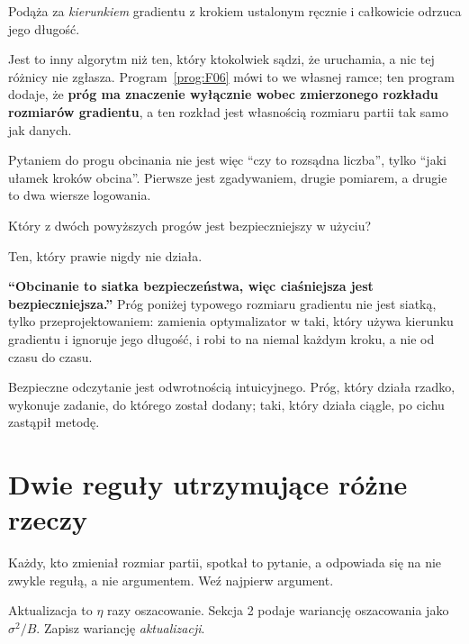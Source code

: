 \begin{fr}
\begin{ansblock}
Podąża za \emph{kierunkiem} gradientu z krokiem ustalonym ręcznie i całkowicie
odrzuca jego długość.
\end{ansblock}

Jest to inny algorytm niż ten, który ktokolwiek sądzi, że uruchamia, a nic tej
różnicy nie zgłasza. Program~\ref{prog:F06} mówi to we własnej ramce; ten
program dodaje, że \textbf{próg ma znaczenie wyłącznie wobec zmierzonego
rozkładu rozmiarów gradientu}, a ten rozkład jest własnością rozmiaru partii
tak samo jak danych.

Pytaniem do progu obcinania nie jest więc \enquote{czy to rozsądna liczba},
tylko \enquote{jaki ułamek kroków obcina}. Pierwsze jest zgadywaniem, drugie
pomiarem, a drugie to dwa wiersze logowania.

Który z dwóch powyższych progów jest bezpieczniejszy w użyciu?
\nextframe
\end{fr}

\begin{fr}
\begin{ansblock}
Ten, który prawie nigdy nie działa.
\end{ansblock}

\begin{trapbox}
\textbf{\enquote{Obcinanie to siatka bezpieczeństwa, więc ciaśniejsza jest
bezpieczniejsza.}} Próg poniżej typowego rozmiaru gradientu nie jest siatką,
tylko przeprojektowaniem: zamienia optymalizator w taki, który używa kierunku
gradientu i ignoruje jego długość, i robi to na niemal każdym kroku, a nie od
czasu do czasu.

Bezpieczne odczytanie jest odwrotnością intuicyjnego. Próg, który działa
rzadko, wykonuje zadanie, do którego został dodany; taki, który działa ciągle,
po cichu zastąpił metodę.
\end{trapbox}
\end{fr}

\section{Dwie reguły utrzymujące różne rzeczy}
\label{sec:P21-scaling}

\begin{fr}
Każdy, kto zmieniał rozmiar partii, spotkał to pytanie, a odpowiada się na nie
zwykle regułą, a nie argumentem. Weź najpierw argument.

Aktualizacja to $\eta$ razy oszacowanie. Sekcja 2 podaje wariancję oszacowania
jako $\sigma^{2}/B$. Zapisz wariancję \emph{aktualizacji}.
\dotline
\nextframe
\end{fr}

